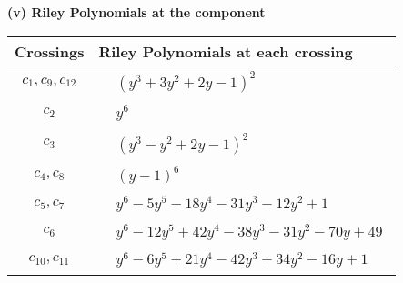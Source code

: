 \documentclass[1p]{elsarticle_modified}
\theoremstyle{definition}
\begin{document}
\newpage\renewcommand{\arraystretch}{1}
\flushleft \textbf{(v) Riley Polynomials at the component}\newline \\
\begin{tabular}{m{50pt}|m{274pt}}
Crossings & \hspace{64pt}Riley Polynomials at each crossing \\
\hline $$\begin{aligned}c_{1},c_{9},c_{12}\end{aligned}$$&$\begin{aligned}
&(y^3+3 y^2+2 y-1)^2
\end{aligned}$\\
\hline $$\begin{aligned}c_{2}\end{aligned}$$&$\begin{aligned}
&y^6
\end{aligned}$\\
\hline $$\begin{aligned}c_{3}\end{aligned}$$&$\begin{aligned}
&(y^3- y^2+2 y-1)^2
\end{aligned}$\\
\hline $$\begin{aligned}c_{4},c_{8}\end{aligned}$$&$\begin{aligned}
&(y-1)^6
\end{aligned}$\\
\hline $$\begin{aligned}c_{5},c_{7}\end{aligned}$$&$\begin{aligned}
&y^6-5 y^5-18 y^4-31 y^3-12 y^2+1
\end{aligned}$\\
\hline $$\begin{aligned}c_{6}\end{aligned}$$&$\begin{aligned}
&y^6-12 y^5+42 y^4-38 y^3-31 y^2-70 y+49
\end{aligned}$\\
\hline $$\begin{aligned}c_{10},c_{11}\end{aligned}$$&$\begin{aligned}
&y^6-6 y^5+21 y^4-42 y^3+34 y^2-16 y+1
\end{aligned}$\\
\hline
\end{tabular}\\~\\
\end{document}
